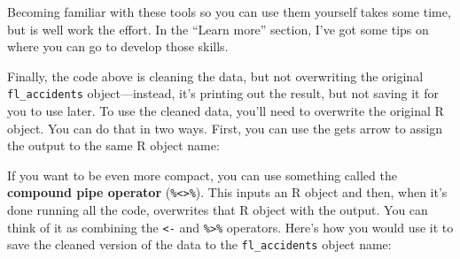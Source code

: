\documentclass[]{tufte-book}
\newenvironment{Shaded}{}{}
\newcommand{\DataTypeTok}[1]{\textcolor[rgb]{0.56,0.13,0.00}{#1}}
\newcommand{\DecValTok}[1]{\textcolor[rgb]{0.25,0.63,0.44}{#1}}
\newcommand{\KeywordTok}[1]{\textcolor[rgb]{0.00,0.44,0.13}{\textbf{#1}}}
\newcommand{\NormalTok}[1]{#1}
\newcommand{\OperatorTok}[1]{\textcolor[rgb]{0.40,0.40,0.40}{#1}}
\newcommand{\StringTok}[1]{\textcolor[rgb]{0.25,0.44,0.63}{#1}}
\begin{document}
Becoming familiar with these tools so you can use them yourself takes some time, but is well
work the effort. In the ``Learn more'' section, I've got some tips on where you can go to
develop those skills.

Finally, the code above is cleaning the data, but not overwriting the original \texttt{fl\_accidents}
object---instead, it's printing out the result, but not saving it for you to use later. To
use the cleaned data, you'll need to overwrite the original R object. You can do that in
two ways. First, you can use the gets arrow to assign the output to the same R object name:

\begin{Shaded}
\end{Shaded}

If you want to be even more compact, you can use something called the \textbf{compound pipe operator}
(\texttt{\%\textless{}\textgreater{}\%}). This inputs an R object and then, when it's done running all the code, overwrites that
R object with the output. You can think of it as combining the \texttt{\textless{}-} and \texttt{\%\textgreater{}\%} operators. Here's
how you would use it to save the cleaned version of the data to the \texttt{fl\_accidents} object name:
\end{document}
